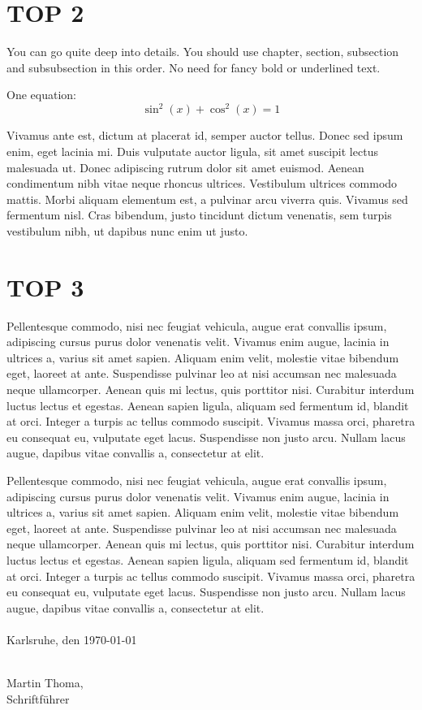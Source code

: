 \documentclass[11pt,a4paper,oneside]{scrartcl}
\newcommand\Schriftfuehrer{Martin Thoma}
\newcommand\Ort{Karlsruhe}
\newcommand\Datum{\today}   %
\begin{document}
\section*{TOP 2}
You can go quite deep into details. You should use chapter, section, 
subsection and subsubsection in this order. No need for fancy bold or
underlined text.

One equation:
\begin{equation}
    \sin^2(x) + \cos^2(x) = 1
\end{equation}

Vivamus ante est, dictum at placerat id, semper auctor tellus. Donec 
\arrow sed ipsum enim, eget lacinia mi. Duis vulputate auctor ligula, sit 
amet suscipit lectus malesuada ut. Donec adipiscing rutrum dolor sit 
amet euismod. Aenean condimentum nibh vitae neque rhoncus ultrices. 
Vestibulum ultrices commodo mattis. Morbi aliquam elementum est, a 
pulvinar arcu viverra quis. Vivamus sed fermentum nisl. Cras 
bibendum, justo tincidunt dictum venenatis, sem turpis vestibulum 
nibh, ut dapibus nunc enim ut justo. 

\section*{TOP 3}
Pellentesque commodo, nisi nec feugiat vehicula, augue erat convallis ipsum, adipiscing cursus purus dolor venenatis velit. Vivamus enim augue, lacinia in ultrices a, varius sit amet sapien. Aliquam enim velit, molestie vitae bibendum eget, laoreet at ante. Suspendisse pulvinar leo at nisi accumsan nec malesuada neque ullamcorper. Aenean quis mi lectus, quis porttitor nisi. Curabitur interdum luctus lectus et egestas. Aenean sapien ligula, aliquam sed fermentum id, blandit at orci. Integer a turpis ac tellus commodo suscipit. Vivamus massa orci, pharetra eu consequat eu, vulputate eget lacus. Suspendisse non justo arcu. Nullam lacus augue, dapibus vitae convallis a, consectetur at elit.

Pellentesque commodo, nisi nec feugiat vehicula, augue erat convallis ipsum, adipiscing cursus purus dolor venenatis velit. Vivamus enim augue, lacinia in ultrices a, varius sit amet sapien. Aliquam enim velit, molestie vitae bibendum eget, laoreet at ante. Suspendisse pulvinar leo at nisi accumsan nec malesuada neque ullamcorper. Aenean quis mi lectus, quis porttitor nisi. Curabitur interdum luctus lectus et egestas. Aenean sapien ligula, aliquam sed fermentum id, blandit at orci. Integer a turpis ac tellus commodo suscipit. Vivamus massa orci, pharetra eu consequat eu, vulputate eget lacus. Suspendisse non justo arcu. Nullam lacus augue, dapibus vitae convallis a, consectetur at elit.
\\\nopagebreak
\\\nopagebreak
\noindent \Ort, den \Datum\\\nopagebreak
\\\nopagebreak
{}

\noindent \Schriftfuehrer,\\\nopagebreak
Schriftführer
\end{document}
